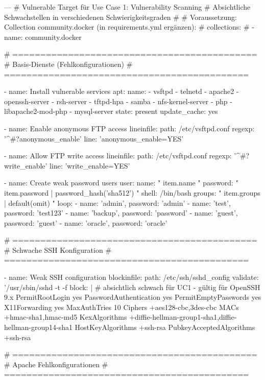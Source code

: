 \begin{GenericCode}
---
# Vulnerable Target für Use Case 1: Vulnerability Scanning
# Absichtliche Schwachstellen in verschiedenen Schwierigkeitsgraden
#
# Voraussetzung: Collection community.docker (in requirements.yml ergänzen):
#   collections:
#     - name: community.docker

# ============================================
# Basis-Dienste (Fehlkonfigurationen)
# ============================================

- name: Install vulnerable services
  apt:
    name:
      - vsftpd
      - telnetd
      - apache2
      - openssh-server
      - rsh-server
      - tftpd-hpa
      - samba
      - nfs-kernel-server
      - php
      - libapache2-mod-php
      - mysql-server
    state: present
    update_cache: yes

- name: Enable anonymous FTP access
  lineinfile:
    path: /etc/vsftpd.conf
    regexp: '^#?anonymous_enable'
    line: 'anonymous_enable=YES'

- name: Allow FTP write access
  lineinfile:
    path: /etc/vsftpd.conf
    regexp: '^#?write_enable'
    line: 'write_enable=YES'

- name: Create weak password users
  user:
    name: "{{ item.name }}"
    password: "{{ item.password | password_hash('sha512') }}"
    shell: /bin/bash
    groups: "{{ item.groups | default(omit) }}"
  loop:
    - { name: 'admin', password: 'admin' }
    - { name: 'test', password: 'test123' }
    - { name: 'backup', password: 'password' }
    - { name: 'guest', password: 'guest' }
    - { name: 'oracle', password: 'oracle' }

# ============================================
# Schwache SSH Konfiguration
# ============================================

- name: Weak SSH configuration
  blockinfile:
    path: /etc/ssh/sshd_config
    validate: '/usr/sbin/sshd -t -f %
    block: |
      # absichtlich schwach für UC1 - gültig für OpenSSH 9.x
      PermitRootLogin yes
      PasswordAuthentication yes
      PermitEmptyPasswords yes
      X11Forwarding yes
      MaxAuthTries 10
      Ciphers +aes128-cbc,3des-cbc
      MACs +hmac-sha1,hmac-md5
      KexAlgorithms +diffie-hellman-group1-sha1,diffie-hellman-group14-sha1
      HostKeyAlgorithms +ssh-rsa
      PubkeyAcceptedAlgorithms +ssh-rsa

# ============================================
# Apache Fehlkonfigurationen
# ============================================


\end{GenericCode}
